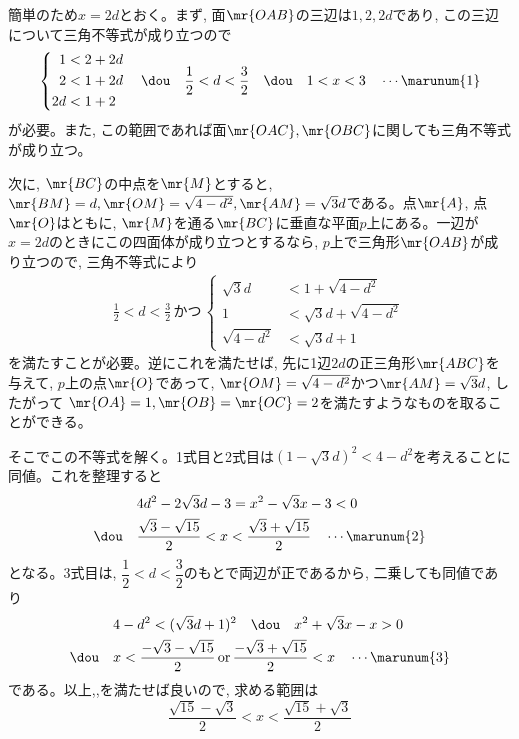 簡単のため$x=2d$とおく。まず, 面$\mr{OAB}$の三辺は$1,2,2d$であり, この三辺について三角不等式が成り立つので 
\begin{align*}
 \left\{
 \begin{aligned}
  1&<2+2d \\
  2&<1+2d \\
  2d&<1+2
 \end{aligned}
 \right. \quad\dou\quad \frac{1}{2}<d<\frac{3}{2} \quad\dou\quad 1<x<3 \quad \cdots\marunum{1}
\end{align*}
が必要。また, この範囲であれば面$\mr{OAC}, \mr{OBC}$に関しても三角不等式が成り立つ。

次に, $\mr{BC}$の中点を$\mr{M}$とすると, $\mr{BM}=d, \mr{OM}=\sqrt{4-d^{2}}, \mr{AM}=\sqrt{3}d$である。点$\mr{A}$, 点$\mr{O}$はともに, $\mr{M}$を通る$\mr{BC}$に垂直な平面$p$上にある。一辺が$x=2d$のときにこの四面体が成り立つとするなら, $p$上で三角形$\mr{OAB}$が成り立つので, 三角不等式により
\begin{align*}
 \frac{1}{2}<d<\frac{3}{2} \,\text{かつ}\,\left\{
 \begin{aligned}
  \sqrt{3}d&<1+\sqrt{4-d^2} \\
  1&<\sqrt{3}d+\sqrt{4-d^2} \\
  \sqrt{4-d^2}&<\sqrt{3}d+1
 \end{aligned}
 \right.
\end{align*}
を満たすことが必要。逆にこれを満たせば, 先に1辺$2d$の正三角形$\mr{ABC}$を与えて, $p$上の点$\mr{O}$であって, $\mr{OM}=\sqrt{4-d^{2}}$かつ$\mr{AM}=\sqrt{3}d$, したがって $\mr{OA}=1, \mr{OB}=\mr{OC}=2$を満たすようなものを取ることができる。

そこでこの不等式を解く。1式目と2式目は$(1-\sqrt{3}d)^{2} < 4-d^{2}$を考えることに同値。これを整理すると
\begin{align*}
 & 4d^2-2\sqrt{3}d-3=x^2-\sqrt{3}x-3 <0 \\
 \dou\quad &\frac{\sqrt{3}-\sqrt{15}}{2}<x<\frac{\sqrt{3}+\sqrt{15}}{2} \quad\cdots\marunum{2}
\end{align*}
となる。3式目は, $\dfrac{1}{2}< d < \dfrac{3}{2}$のもとで両辺が正であるから, 二乗しても同値であり
\begin{align*}
 & 4-d^2<(\sqrt{3}d+1)^2 \quad\dou\quad x^2+\sqrt{3}x-x>0 \\
 \dou\quad & x<\frac{-\sqrt{3}-\sqrt{15}}{2} \,\text{or}\, \frac{-\sqrt{3}+\sqrt{15}}{2} < x \quad\cdots\marunum{3}
\end{align*}
である。以上,,を満たせば良いので, 求める範囲は
\[ \dfrac{\sqrt{15}-\sqrt{3}}{2} < x  < \dfrac{\sqrt{15}+\sqrt{3}}{2} \]

